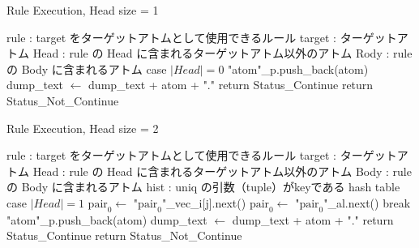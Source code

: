 \begin{algorithm}
    \caption{Rule Execution, Head size = 1}
\begin{algorithmic}
    \scriptsize
    \Require rule : target をターゲットアトムとして使用できるルール
    \Require target : ターゲットアトム
    \Require Head : rule の Head に含まれるターゲットアトム以外のアトム
    \Require Rody : rule の Body に含まれるアトム
        \State case $|Head|=0$
                    \State "atom"\_p.push\_back(atom)
                \Else
                    \State dump\_text $\gets$ dump\_text + atom + "."
                \EndIf
            \EndFor
                \State return Status\_Continue
            \EndIf
        \EndIf
        \State return Status\_Not\_Continue
    \EndProcedure
\end{algorithmic}
\end{algorithm}


\begin{algorithm}
    \caption{Rule Execution, Head size = 2}
\begin{algorithmic}
    \scriptsize
    \Require rule : target をターゲットアトムとして使用できるルール
    \Require target : ターゲットアトム
    \Require Head : rule の Head に含まれるターゲットアトム以外のアトム
    \Require Body : rule の Body に含まれるアトム
    \Require hist : uniq の引数（tuple）がkeyである hash table  
        \State case $|Head|=1$
                \State $\text{pair}_0 \gets$ "$\text{pair}_0$"\_vec\_i[j].next() 
            \Else
                \State $\text{pair}_0 \gets$ "$\text{pair}_0$"\_al.next()
            \EndIf
             
                \State break
            \EndIf
                        \State "atom"\_p.push\_back(atom)
                    \Else
                        \State dump\_text $\gets$ dump\_text + atom + "."
                    \EndIf
                \EndFor
                    \State return Status\_Continue
                \EndIf
            \EndIf
        \EndWhile
        \State return Status\_Not\_Continue
    \EndProcedure
\end{algorithmic}
\end{algorithm}


